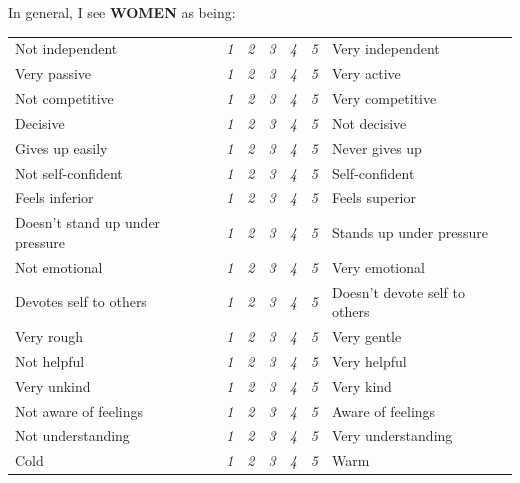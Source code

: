 \documentclass[serif, authordate, twocolumn, empirical]{jote-article}
\begin{document}

In general, I see \textbf{WOMEN} as being:\vspace{-.7\baselineskip}
\begin{table}[h!] \sffamily
\begin{tabularx}{\columnwidth}{@{}p{}p{}p{}p{}p{}p{}p{}@{}}
\hline
Not independent & \textit{1} & \textit{2} & \textit{3} & \textit{4} & \textit{5} & Very independent \\
Very passive                    & \textit{1} & \textit{2} & \textit{3} & \textit{4} & \textit{5} & Very active                   \\
Not competitive                 & \textit{1} & \textit{2} & \textit{3} & \textit{4} & \textit{5} & Very competitive              \\
Decisive                        & \textit{1} & \textit{2} & \textit{3} & \textit{4} & \textit{5} & Not decisive                  \\
Gives up easily                 & \textit{1} & \textit{2} & \textit{3} & \textit{4} & \textit{5} & Never gives up                \\
Not self-confident              & \textit{1} & \textit{2} & \textit{3} & \textit{4} & \textit{5} & Self-confident                \\
Feels inferior                  & \textit{1} & \textit{2} & \textit{3} & \textit{4} & \textit{5} & Feels superior                \\
Doesn’t stand up under pressure & \textit{1} & \textit{2} & \textit{3} & \textit{4} & \textit{5} & Stands up under pressure      \\
Not emotional                   & \textit{1} & \textit{2} & \textit{3} & \textit{4} & \textit{5} & Very emotional                \\
Devotes self to others          & \textit{1} & \textit{2} & \textit{3} & \textit{4} & \textit{5} & Doesn’t devote self to others \\
Very rough                      & \textit{1} & \textit{2} & \textit{3} & \textit{4} & \textit{5} & Very gentle                   \\
Not helpful                     & \textit{1} & \textit{2} & \textit{3} & \textit{4} & \textit{5} & Very helpful                  \\
Very unkind                     & \textit{1} & \textit{2} & \textit{3} & \textit{4} & \textit{5} & Very kind                     \\
Not aware of feelings           & \textit{1} & \textit{2} & \textit{3} & \textit{4} & \textit{5} & Aware of feelings             \\
Not understanding               & \textit{1} & \textit{2} & \textit{3} & \textit{4} & \textit{5} & Very understanding            \\
Cold                            & \textit{1} & \textit{2} & \textit{3} & \textit{4} & \textit{5} & Warm                         
\end{tabularx}
\end{table}
\end{document}
